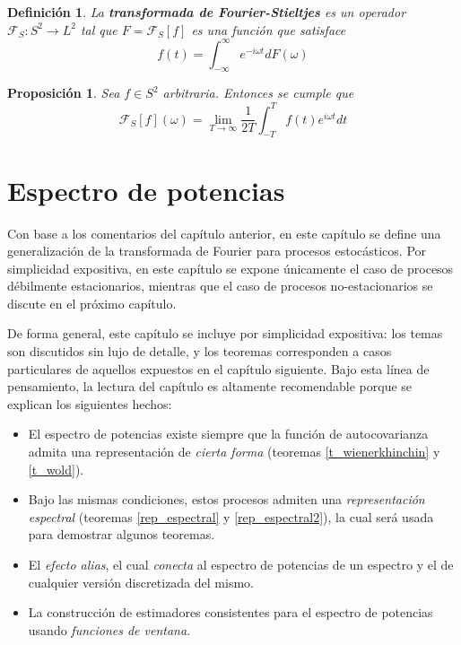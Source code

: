\documentclass[12pt,letterpaper]{book}
\newtheorem{definicion}{Definición}[chapter]
\newtheorem{proposicion}[teorema]{Proposición}
\newcommand{\intR}{\int_{-\infty}^{\infty}}
\begin{document}
\begin{definicion}
La \textbf{transformada de Fourier-Stieltjes} es un  operador $\mathcal{F}_S:S^2\rightarrow L^2$ tal que $F = \mathcal{F}_S[f]$ es una función que satisface
\begin{equation}
f(t) = \intR e^{-i \omega t} dF(\omega)
\end{equation}
\end{definicion}

\begin{proposicion}
Sea $f \in S^2$ arbitraria. Entonces se cumple que
\begin{equation}
\mathcal{F}_S[f] (\omega) = 
\lim_{T\rightarrow\infty} \frac{1}{2T} \int_{-T}^T f(t) e^{i \omega t} dt
\end{equation}
\end{proposicion}


\chapter{Espectro de potencias}
\label{capitulo:espectro}

Con base a los comentarios del capítulo anterior, en este capítulo se define una generalización de la transformada de Fourier para procesos estocásticos.
%
Por simplicidad expositiva, en este capítulo se expone únicamente el caso de procesos débilmente estacionarios, mientras que el caso de procesos no-estacionarios se discute en el próximo capítulo.

De forma general, este capítulo se incluye por simplicidad expositiva: los temas son discutidos sin lujo de detalle, y los teoremas corresponden a casos particulares de aquellos expuestos en el capítulo siguiente.
%
Bajo esta línea de pensamiento, la lectura del capítulo es altamente recomendable porque se explican los siguientes hechos:
\begin{itemize}
\item El espectro de potencias existe siempre que la función de autocovarianza admita una representación de \textit{cierta forma} (teoremas \ref{t_wienerkhinchin} y \ref{t_wold}).
\item Bajo las mismas condiciones, estos procesos admiten una \textit{representación espectral} (teoremas \ref{rep_espectral} y \ref{rep_espectral2}), la cual será usada para demostrar algunos teoremas.
\item El \textit{efecto alias}, el cual \textit{conecta} al espectro de potencias de un espectro y el de cualquier versión discretizada del mismo.
\item La construcción de estimadores consistentes para el espectro de potencias usando \textit{funciones de ventana}.
\end{itemize}
\end{document}
